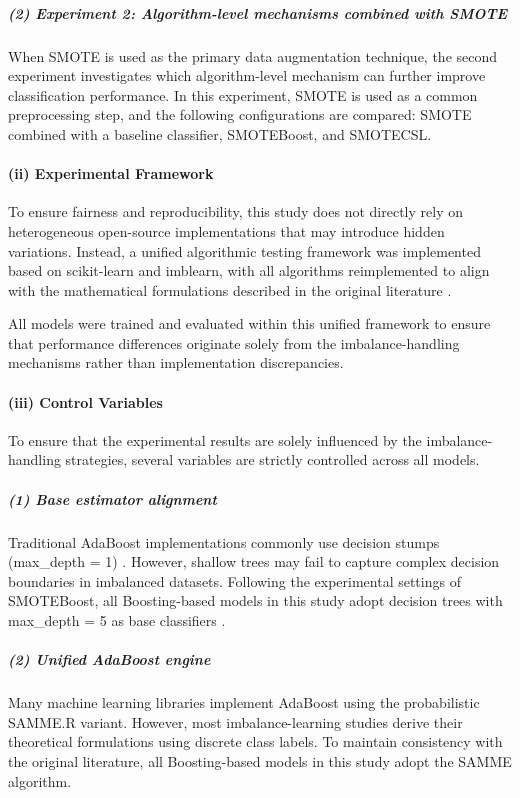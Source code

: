 \documentclass[sigconf]{acmart}
\begin{document}
\subparagraph{(2) Experiment 2: Algorithm-level mechanisms combined with SMOTE}

When SMOTE is used as the primary data augmentation technique, the second experiment investigates which algorithm-level mechanism can further improve classification performance. In this experiment, SMOTE is used as a common preprocessing step, and the following configurations are compared: SMOTE combined with a baseline classifier, SMOTEBoost, and SMOTECSL. 

\paragraph{(ii) Experimental Framework}

To ensure fairness and reproducibility, this study does not directly rely on heterogeneous open-source implementations that may introduce hidden variations. Instead, a unified algorithmic testing framework was implemented based on scikit-learn and imblearn, with all algorithms reimplemented to align with the mathematical formulations described in the original literature \cite{23, 24, 26}. 

All models were trained and evaluated within this unified framework to ensure that performance differences originate solely from the imbalance-handling mechanisms rather than implementation discrepancies. 

\paragraph{(iii) Control Variables}
To ensure that the experimental results are solely influenced by the imbalance-handling strategies, several variables are strictly controlled across all models. 

\subparagraph{(1) Base estimator alignment}
Traditional AdaBoost implementations commonly use decision stumps (max\_depth = 1) \cite{18}. However, shallow trees may fail to capture complex decision boundaries in imbalanced datasets. Following the experimental settings of SMOTEBoost, all Boosting-based models in this study adopt decision trees with max\_depth = 5 as base classifiers \cite{23, 24, 25, 26}. 

\subparagraph{(2) Unified AdaBoost engine}
Many machine learning libraries implement AdaBoost using the probabilistic SAMME.R variant. However, most imbalance-learning studies derive their theoretical formulations using discrete class labels. To maintain consistency with the original literature, all Boosting-based models in this study adopt the SAMME algorithm. 
\end{document}
